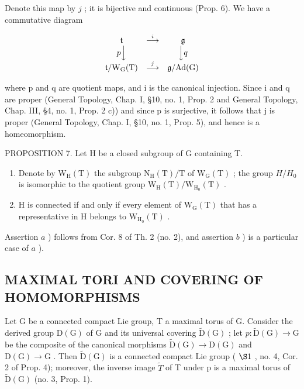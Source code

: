 Denote this map by \(j\) ; it is bijective and continuous (Prop. 6). We have a commutative diagram

\[
\begin{array}{c c c} \mathfrak {t} & \stackrel {{i}} {{\longrightarrow}} & \mathfrak {g} \\ p \Big \downarrow & & \Big \downarrow q \\ \mathfrak {t} / \mathrm{W} _ {\mathrm{G}} (\mathrm{T}) & \stackrel {{j}} {{\longrightarrow}} & \mathfrak {g} / \mathrm{Ad} (\mathrm{G}) \end{array}
\]

where p and q are quotient maps, and i is the canonical injection. Since i and q are proper (General Topology, Chap. I, §10, no. 1, Prop. 2 and General Topology, Chap. III, §4, no. 1, Prop. 2 c)) and since p is surjective, it follows that j is proper (General Topology, Chap. I, §10, no. 1, Prop. 5), and hence is a homeomorphism.

PROPOSITION 7. Let H be a closed subgroup of G containing T.

\begin{enumerate}
\def\labelenumi{\alph{enumi})}
\item
  Denote by \(\mathrm{W}_{\mathrm{H}}(\mathrm{T})\) the subgroup \(\mathrm{N}_{\mathrm{H}}(\mathrm{T})/\mathrm{T}\) of \(\mathrm{W}_{\mathrm{G}}(\mathrm{T})\) ; the group \(H/H_{0}\) is isomorphic to the quotient group \(\mathrm{W}_{\mathrm{H}}(\mathrm{T})/\mathrm{W}_{\mathrm{H}_{0}}(\mathrm{T})\) .
\item
  H is connected if and only if every element of \(\mathrm{W}_{\mathrm{G}}(\mathrm{T})\) that has a representative in H belongs to \(\mathrm{W}_{\mathrm{H}_{0}}(\mathrm{T})\) .
\end{enumerate}

Assertion \(a\) ) follows from Cor. 8 of Th. 2 (no. 2), and assertion \(b\) ) is a particular case of \(a\) ).

\subsection{MAXIMAL TORI AND COVERING OF HOMOMORPHISMS}

Let G be a connected compact Lie group, T a maximal torus of G. Consider the derived group \(\mathrm{D}(\mathrm{G})\) of G and its universal covering \(\tilde{\mathrm{D}}(\mathrm{G})\) ; let \(p: \tilde{\mathrm{D}}(\mathrm{G}) \to \mathrm{G}\) be the composite of the canonical morphisms \(\tilde{\mathrm{D}}(\mathrm{G}) \to \mathrm{D}(\mathrm{G})\) and \(\mathrm{D}(\mathrm{G}) \to \mathrm{G}\) . Then \(\tilde{\mathrm{D}}(\mathrm{G})\) is a connected compact Lie group ( \(\S1\) , no. 4, Cor. 2 of Prop. 4); moreover, the inverse image \(\tilde{T}\) of T under p is a maximal torus of \(\tilde{\mathrm{D}}(\mathrm{G})\) (no. 3, Prop. 1).

